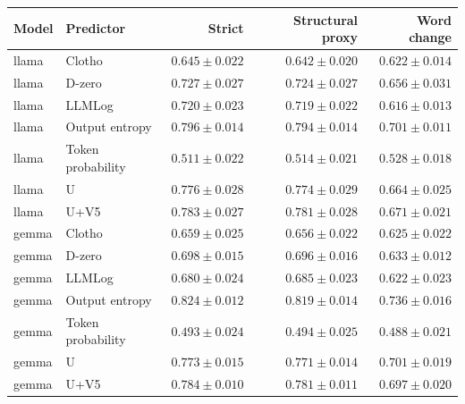\begin{tabular}{llrrr}
\toprule
Model & Predictor & Strict & Structural proxy & Word change \\
\midrule
llama & Clotho & $0.645 \pm 0.022$ & $0.642 \pm 0.020$ & $0.622 \pm 0.014$ \\
llama & D-zero & $0.727 \pm 0.027$ & $0.724 \pm 0.027$ & $0.656 \pm 0.031$ \\
llama & LLMLog & $0.720 \pm 0.023$ & $0.719 \pm 0.022$ & $0.616 \pm 0.013$ \\
llama & Output entropy & $0.796 \pm 0.014$ & $0.794 \pm 0.014$ & $0.701 \pm 0.011$ \\
llama & Token probability & $0.511 \pm 0.022$ & $0.514 \pm 0.021$ & $0.528 \pm 0.018$ \\
llama & U & $0.776 \pm 0.028$ & $0.774 \pm 0.029$ & $0.664 \pm 0.025$ \\
llama & U+V5 & $0.783 \pm 0.027$ & $0.781 \pm 0.028$ & $0.671 \pm 0.021$ \\
\midrule
gemma & Clotho & $0.659 \pm 0.025$ & $0.656 \pm 0.022$ & $0.625 \pm 0.022$ \\
gemma & D-zero & $0.698 \pm 0.015$ & $0.696 \pm 0.016$ & $0.633 \pm 0.012$ \\
gemma & LLMLog & $0.680 \pm 0.024$ & $0.685 \pm 0.023$ & $0.622 \pm 0.023$ \\
gemma & Output entropy & $0.824 \pm 0.012$ & $0.819 \pm 0.014$ & $0.736 \pm 0.016$ \\
gemma & Token probability & $0.493 \pm 0.024$ & $0.494 \pm 0.025$ & $0.488 \pm 0.021$ \\
gemma & U & $0.773 \pm 0.015$ & $0.771 \pm 0.014$ & $0.701 \pm 0.019$ \\
gemma & U+V5 & $0.784 \pm 0.010$ & $0.781 \pm 0.011$ & $0.697 \pm 0.020$ \\
\bottomrule
\end{tabular}
